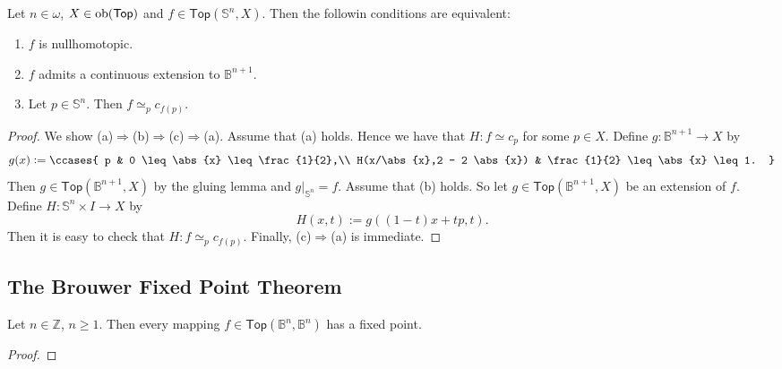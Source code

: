 \begin{proposition}
	Let $n \in \omega$, $X \in \operatorname{ob}(\mathsf{Top})$ and $f \in \mathsf{Top}(\mathbb{S}^n,X)$. Then the followin conditions are equivalent:
	\begin{enumerate}[label = \textup{(}\alph*\textup{)},wide = 0pt]
		\item $f$ is nullhomotopic.
		\item $f$ admits a continuous extension to $\mathbb{B}^{n+1}$.
		\item Let $p \in \mathbb{S}^n$. Then $f \simeq_p c_{f(p)}$.
	\end{enumerate}
\end{proposition}

\begin{proof}
	We show (a)$\Rightarrow$(b)$\Rightarrow$(c)$\Rightarrow$(a). Assume that (a) holds. Hence we have that $H : f \simeq c_p$ for some $p \in X$. Define $g : \mathbb{B}^{n+1} \to X$ by
	\begin{equation*}
		g(x) := \ccases{
			p & 0 \leq \abs{x} \leq \frac{1}{2},\\
			H(x/\abs{x},2 - 2 \abs{x}) & \frac{1}{2} \leq \abs{x} \leq 1.
		}
	\end{equation*}
	Then $g \in \mathsf{Top}(\mathbb{B}^{n+1},X)$ by the gluing lemma and $g\vert_{\mathbb{S}^n} = f$. Assume that (b) holds. So let $g \in \mathsf{Top}(\mathbb{B}^{n+1},X)$ be an extension of $f$. Define $H : \mathbb{S}^n \times I \to X$ by
	\begin{equation*}
		H(x,t) := g((1 - t)x + tp,t).
	\end{equation*}
	Then it is easy to check that $H : f \simeq_p c_{f(p)}$. Finally, (c)$\Rightarrow$(a) is immediate.
\end{proof}

\subsection*{The Brouwer Fixed Point Theorem}
\begin{theorem}
	Let $n \in \mathbb{Z}$, $n \geq 1$. Then every mapping $f \in \mathsf{Top}(\mathbb{B}^n,\mathbb{B}^n)$ has a fixed point.	
	\label{thm:brouwer_fixed_point}
\end{theorem}

\begin{proof}
	
\end{proof}
